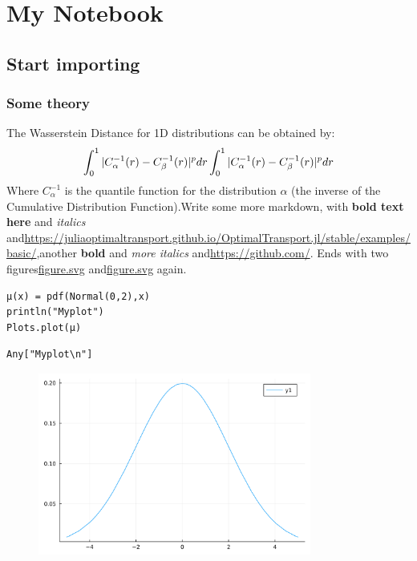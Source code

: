 \newpage

\chapter{My Notebook}

\section{Start importing}

\subsection{Some theory}
The Wasserstein Distance for 1D distributions can be obtained by:
\begin{displaymath}
	\int_0^1 |C_\alpha^{-1}(r) - C_\beta^{-1}(r)|^p dr \\
	\int_0^1 |C_\alpha^{-1}(r) - C_\beta^{-1}(r)|^p dr
\end{displaymath}
Where $C_\alpha^{-1}$ is the quantile function for the distribution $\alpha$ (the inverse of the Cumulative Distribution Function).Write some more markdown, with \textbf{bold text here} and \textit{italics} and\href{a link here}{https://juliaoptimaltransport.github.io/OptimalTransport.jl/stable/examples/basic/},another \textbf{bold} and \textit{more italics} and\href{another}{https://github.com/}. Ends with two figures\href{Figure}{figure.svg} and\href{Figure 2}{figure.svg} again.
\begin{lstlisting}[language=JuliaLocal, style=julia]
μ(x) = pdf(Normal(0,2),x)
println("Myplot")
Plots.plot(μ)
\end{lstlisting}

\begin{verbatim}
Any["Myplot\n"]
\end{verbatim}

\begin{figure}[H]
	\centering
	\includegraphics[width=0.8\textwidth]{./figures/jupyternotebook_figure1.svg}
	\label{fig:jupyternotebook_figure1.svg}

\end{figure}

